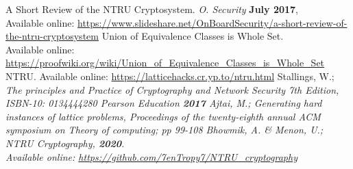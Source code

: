 \documentclass[cryptography,article,submit,moreauthors,pdftex]{Definitions/mdpi}
\begin{document}
\begin{thebibliography}{999}
A Short Review of the NTRU Cryptosystem. {\em O. Security} {\textbf{July 2017}}, \\Available online: \href{https://www.slideshare.net/OnBoardSecurity/a-short-review-of-the-ntru-cryptosystem}{https://www.slideshare.net/OnBoardSecurity/a-short-review-of-the-ntru-cryptosystem}
Union of Equivalence Classes is Whole Set.\\Available online: \href{https://proofwiki.org/wiki/Union_of_Equivalence_Classes_is_Whole_Set}{https://proofwiki.org/wiki/Union\_of\_Equivalence\_Classes\_is\_Whole\_Set}
NTRU. Available online: \href{https://latticehacks.cr.yp.to/ntru.html}{https://latticehacks.cr.yp.to/ntru.html}
Stallings, W.; \em{The principles and Practice of Cryptography and Network Security 7th Edition, ISBN-10: 0134444280} \em{Pearson Education} \textbf{2017}
 Ajtai, M.; \em{Generating hard instances of lattice problems}, \em{Proceedings of the twenty-eighth annual ACM symposium on Theory of computing}; pp 99-108
 Bhowmik, A. \& Menon, U.; \textit{NTRU Cryptography}, {\textbf{2020}}. \\Available online: \href{https://github.com/7enTropy7/NTRU_cryptography}{https://github.com/7enTropy7/NTRU\_cryptography}
\end{thebibliography}
\end{document}
